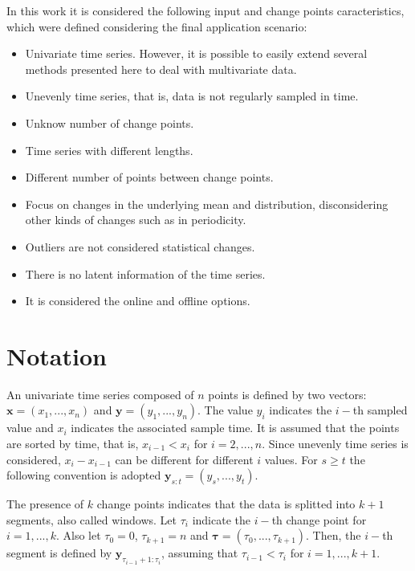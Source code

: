 In this work it is considered the following input and change points caracteristics, which were defined considering the final application scenario:
\begin{itemize}
    \item Univariate time series. However, it is possible to easily extend several methods presented here to deal with multivariate data.
    \item Unevenly time series, that is, data is not regularly sampled in time.
    \item Unknow number of change points.
    \item Time series with different lengths.
    \item Different number of points between change points.
    \item Focus on changes in the underlying mean and distribution, disconsidering other kinds of changes such as in periodicity.
    \item Outliers are not considered statistical changes.
    \item There is no latent information of the time series.
    \item It is considered the online and offline options.
\end{itemize}

\section{Notation}

An univariate time series composed of $n$ points is defined by two vectors: $\mathbf{x} = (x_{1}, ..., x_{n})$ and $\mathbf{y} = (y_{1}, ..., y_{n})$. The value $y_{i}$ indicates the $i-$th sampled value and $x_{i}$ indicates the associated sample time. It is assumed that the points are sorted by time, that is, $x_{i - 1} < x_{i}$ for $i = 2, ..., n$. Since unevenly time series is considered, $x_{i} - x_{i - 1}$ can be different for different $i$ values. For $s \ge t$ the following convention is adopted $\mathbf{y}_{s:t} = (y_{s}, ..., y_{t})$.

The presence of $k$ change points indicates that the data is splitted into $k+1$ segments, also called windows. Let $\tau_{i}$ indicate the $i-$th change point for $i=1,...,k$. Also let $\tau_{0} = 0$, $\tau_{k + 1} = n$ and $\boldsymbol \tau = (\tau_{0}, ..., \tau_{k + 1})$. Then, the $i-$th segment is defined by $\mathbf{y}_{\tau_{i - 1} + 1 : \tau_{i}}$, assuming that $\tau_{i - 1} < \tau_{i}$ for $i = 1, ..., k + 1$.

